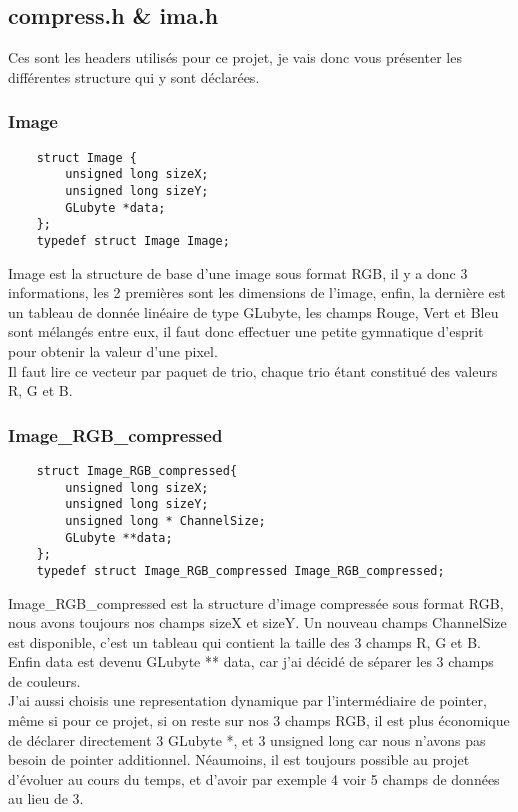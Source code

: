 \documentclass[12pt, letterpaper]{article}
\begin{document}
\subsection{compress.h  \& ima.h}
Ces sont les headers utilisés pour ce projet, je vais donc vous présenter les différentes structure qui y sont déclarées.
\subsubsection{Image}
\begin{verbatim}
    struct Image {
        unsigned long sizeX;
        unsigned long sizeY;
        GLubyte *data;
    };
    typedef struct Image Image;        
\end{verbatim}
Image est la structure de base d'une image sous format RGB, il y a donc 3 informations, les 2 premières sont les dimensions de l'image, 
enfin, la dernière est un tableau de donnée linéaire de type GLubyte, les champs Rouge, Vert et Bleu sont mélangés entre eux, 
il faut donc effectuer une petite gymnatique d'esprit pour obtenir la valeur d'une pixel.\\
Il faut lire ce vecteur par paquet de trio, chaque trio étant constitué des valeurs R, G et B.

\subsubsection{Image\_RGB\_compressed}
\begin{verbatim}
    struct Image_RGB_compressed{
        unsigned long sizeX;
        unsigned long sizeY;
        unsigned long * ChannelSize;
        GLubyte **data;
    };
    typedef struct Image_RGB_compressed Image_RGB_compressed;
\end{verbatim}
Image\_RGB\_compressed est la structure d'image compressée sous format RGB, nous avons toujours nos champs sizeX et sizeY. 
Un nouveau champs ChannelSize est disponible, c'est un tableau qui contient la taille des 3 champs R, G et B.\\
Enfin data est devenu GLubyte ** data, car j'ai décidé de séparer les 3 champs de couleurs. \\
J'ai aussi choisis une representation dynamique par l'intermédiaire de pointer, même si pour ce projet, si on reste sur nos 3 champs RGB, il est plus économique de 
déclarer directement 3 GLubyte *, et 3 unsigned long car nous n'avons pas besoin de pointer additionnel. Néaumoins, il est toujours possible au projet d'évoluer au cours du temps, 
et d'avoir par exemple 4 voir 5 champs de données au lieu de 3.
\end{document}
